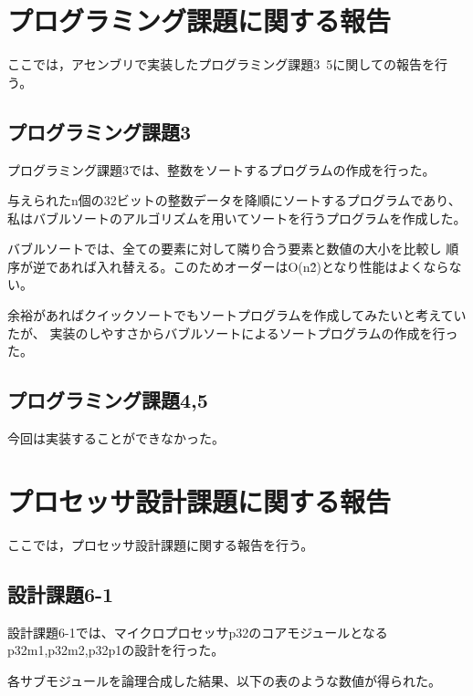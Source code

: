 \documentclass{jarticle}[11pt]
\begin{document}
\newpage


\section{プログラミング課題に関する報告}
\label{sec:プログラミング課題に関する報告}

ここでは，アセンブリで実装したプログラミング課題3~5に関しての報告を行う。

\subsection{プログラミング課題3}

プログラミング課題3では、整数をソートするプログラムの作成を行った。

与えられたn個の32ビットの整数データを降順にソートするプログラムであり、
私はバブルソートのアルゴリズムを用いてソートを行うプログラムを作成した。

バブルソートでは、全ての要素に対して隣り合う要素と数値の大小を比較し
順序が逆であれば入れ替える。このためオーダーはO(n\^2)となり性能はよくならない。

余裕があればクイックソートでもソートプログラムを作成してみたいと考えていたが、
実装のしやすさからバブルソートによるソートプログラムの作成を行った。


\subsection{プログラミング課題4,5}

今回は実装することができなかった。



\section{プロセッサ設計課題に関する報告}
\label{sec:プロセッサ設計課題に関する報告}

ここでは，プロセッサ設計課題に関する報告を行う。

\subsection{設計課題6-1}

設計課題6-1では、マイクロプロセッサp32のコアモジュールとなるp32m1,p32m2,p32p1の設計を行った。

各サブモジュールを論理合成した結果、以下の表のような数値が得られた。
\end{document}
